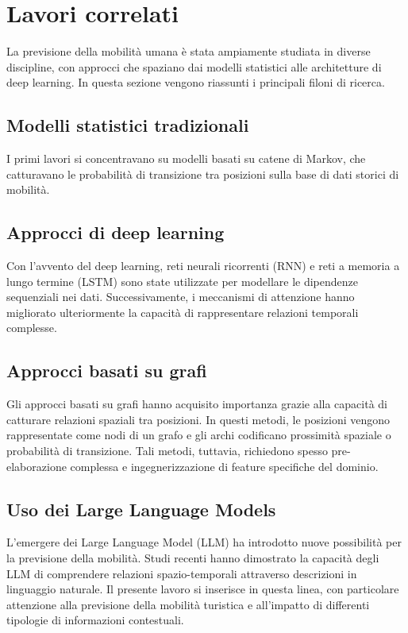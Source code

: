 \chapter{Lavori correlati}

La previsione della mobilità umana è stata ampiamente studiata in diverse discipline, 
con approcci che spaziano dai modelli statistici alle architetture di deep learning. 
In questa sezione vengono riassunti i principali filoni di ricerca.

\section{Modelli statistici tradizionali}
I primi lavori si concentravano su modelli basati su catene di Markov, 
che catturavano le probabilità di transizione tra posizioni 
sulla base di dati storici di mobilità.

\section{Approcci di deep learning}
Con l’avvento del deep learning, reti neurali ricorrenti (RNN) e 
reti a memoria a lungo termine (LSTM) sono state utilizzate 
per modellare le dipendenze sequenziali nei dati. 
Successivamente, i meccanismi di attenzione hanno migliorato ulteriormente 
la capacità di rappresentare relazioni temporali complesse.

\section{Approcci basati su grafi}
Gli approcci basati su grafi hanno acquisito importanza grazie alla capacità 
di catturare relazioni spaziali tra posizioni. 
In questi metodi, le posizioni vengono rappresentate come nodi di un grafo 
e gli archi codificano prossimità spaziale o probabilità di transizione. 
Tali metodi, tuttavia, richiedono spesso pre-elaborazione complessa 
e ingegnerizzazione di feature specifiche del dominio.

\section{Uso dei Large Language Models}
L’emergere dei Large Language Model (LLM) ha introdotto nuove possibilità 
per la previsione della mobilità. 
Studi recenti hanno dimostrato la capacità degli LLM di comprendere 
relazioni spazio-temporali attraverso descrizioni in linguaggio naturale. 
Il presente lavoro si inserisce in questa linea, con particolare attenzione 
alla previsione della mobilità turistica e all’impatto 
di differenti tipologie di informazioni contestuali.